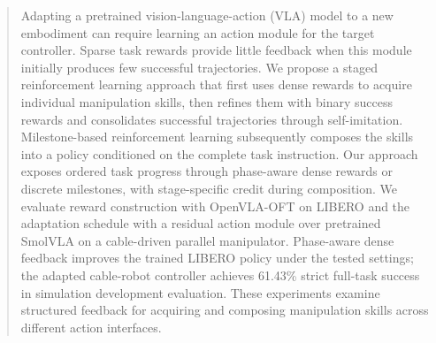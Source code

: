\begin{abstract}
Adapting a pretrained vision-language-action (VLA) model to a new embodiment can require learning an action module for the target controller. Sparse task rewards provide little feedback when this module initially produces few successful trajectories. We propose a staged reinforcement learning approach that first uses dense rewards to acquire individual manipulation skills, then refines them with binary success rewards and consolidates successful trajectories through self-imitation. Milestone-based reinforcement learning subsequently composes the skills into a policy conditioned on the complete task instruction. Our approach exposes ordered task progress through phase-aware dense rewards or discrete milestones, with stage-specific credit during composition. We evaluate reward construction with OpenVLA-OFT on LIBERO and the adaptation schedule with a residual action module over pretrained SmolVLA on a cable-driven parallel manipulator. Phase-aware dense feedback improves the trained LIBERO policy under the tested settings; the adapted cable-robot controller achieves 61.43\% strict full-task success in simulation development evaluation.  These experiments examine structured feedback for acquiring and composing manipulation skills across different action interfaces.
\end{abstract}
